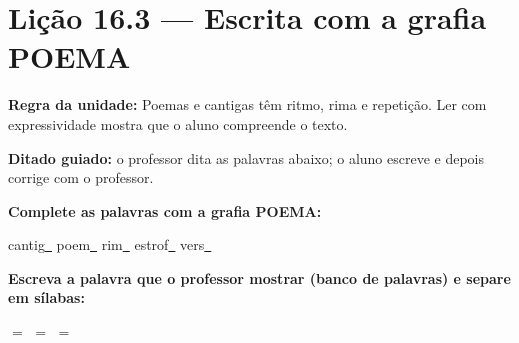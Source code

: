 \section{Lição 16.3 --- Escrita com a grafia POEMA}

\noindent\textbf{Regra da unidade:} Poemas e cantigas têm ritmo, rima e repetição. Ler com expressividade mostra que o aluno compreende o texto.


\noindent\textbf{Ditado guiado:} o professor dita as palavras abaixo; o aluno escreve e depois corrige com o professor.

\begin{center}
  \underline{\hspace{2.3cm}} \quad \underline{\hspace{2.3cm}} \quad \underline{\hspace{2.3cm}} \quad \underline{\hspace{2.3cm}}

  \underline{\hspace{2.3cm}} \quad \underline{\hspace{2.3cm}} \quad \underline{\hspace{2.3cm}} \quad \underline{\hspace{2.3cm}}
\end{center}

\noindent\textbf{Complete as palavras com a grafia POEMA:}
\begin{center}
  cantig\underline{~} \quad poem\underline{~} \quad rim\underline{~} \quad estrof\underline{~} \quad vers\underline{~}
\end{center}

\noindent\textbf{Escreva a palavra que o professor mostrar (banco de palavras) e separe em sílabas:}

\begin{center}
  \underline{\hspace{2cm}} $=$ \underline{\hspace{2cm}} \quad \underline{\hspace{2cm}} $=$ \underline{\hspace{2cm}} \quad \underline{\hspace{2cm}} $=$ \underline{\hspace{2cm}}
  \end{center}



